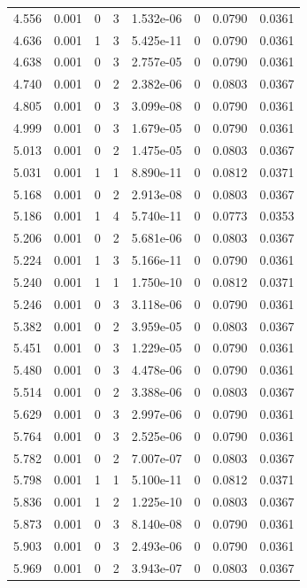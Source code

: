 \documentclass[preview]{standalone}
\begin{document}
{{{\begin{tabular}{L{1.2cm}C{1.2cm} C{0.3cm}C{0.5cm} C{1.4cm}C{1.4cm} C{1.4cm}C{1.4cm}}
  4.556  &  0.001  & 0     &  3 &  1.532e-06  & 0  & 0.0790 &  0.0361   \\ 
  4.636  &  0.001  & 1     &  3 &  5.425e-11  & 0  & 0.0790 &  0.0361   \\ 
  4.638  &  0.001  & 0     &  3 &  2.757e-05  & 0  & 0.0790 &  0.0361   \\ 
  4.740  &  0.001  & 0     &  2 &  2.382e-06  & 0  & 0.0803 &  0.0367   \\ 
  4.805  &  0.001  & 0     &  3 &  3.099e-08  & 0  & 0.0790 &  0.0361   \\ 
  4.999  &  0.001  & 0     &  3 &  1.679e-05  & 0  & 0.0790 &  0.0361   \\ 
  5.013  &  0.001  & 0     &  2 &  1.475e-05  & 0  & 0.0803 &  0.0367   \\ 
  5.031  &  0.001  & 1     &  1 &  8.890e-11  & 0  & 0.0812 &  0.0371   \\ 
  5.168  &  0.001  & 0     &  2 &  2.913e-08  & 0  & 0.0803 &  0.0367   \\ 
  5.186  &  0.001  & 1     &  4 &  5.740e-11  & 0  & 0.0773 &  0.0353   \\ 
  5.206  &  0.001  & 0     &  2 &  5.681e-06  & 0  & 0.0803 &  0.0367   \\ 
  5.224  &  0.001  & 1     &  3 &  5.166e-11  & 0  & 0.0790 &  0.0361   \\ 
  5.240  &  0.001  & 1     &  1 &  1.750e-10  & 0  & 0.0812 &  0.0371   \\ 
  5.246  &  0.001  & 0     &  3 &  3.118e-06  & 0  & 0.0790 &  0.0361   \\ 
  5.382  &  0.001  & 0     &  2 &  3.959e-05  & 0  & 0.0803 &  0.0367   \\ 
  5.451  &  0.001  & 0     &  3 &  1.229e-05  & 0  & 0.0790 &  0.0361   \\ 
  5.480  &  0.001  & 0     &  3 &  4.478e-06  & 0  & 0.0790 &  0.0361   \\ 
  5.514  &  0.001  & 0     &  2 &  3.388e-06  & 0  & 0.0803 &  0.0367   \\ 
  5.629  &  0.001  & 0     &  3 &  2.997e-06  & 0  & 0.0790 &  0.0361   \\ 
  5.764  &  0.001  & 0     &  3 &  2.525e-06  & 0  & 0.0790 &  0.0361   \\ 
  5.782  &  0.001  & 0     &  2 &  7.007e-07  & 0  & 0.0803 &  0.0367   \\ 
  5.798  &  0.001  & 1     &  1 &  5.100e-11  & 0  & 0.0812 &  0.0371   \\ 
  5.836  &  0.001  & 1     &  2 &  1.225e-10  & 0  & 0.0803 &  0.0367   \\ 
  5.873  &  0.001  & 0     &  3 &  8.140e-08  & 0  & 0.0790 &  0.0361   \\ 
  5.903  &  0.001  & 0     &  3 &  2.493e-06  & 0  & 0.0790 &  0.0361   \\ 
  5.969  &  0.001  & 0     &  2 &  3.943e-07  & 0  & 0.0803 &  0.0367   \\ 
\hline 
\end{tabular} 

}}}
\end{document}
